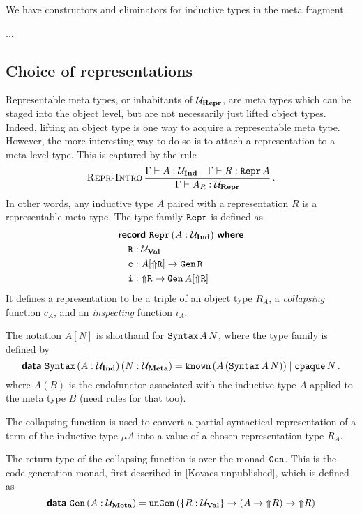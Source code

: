 We have constructors and eliminators for inductive types in the meta fragment.

...

\subsection{Choice of representations}

Representable meta types, or inhabitants of $\Ur$, are meta types which can be
staged into the object level, but are not necessarily just lifted object types.
Indeed, lifting an object type is one way to acquire a representable meta type.
However, the more interesting way to do so is to attach a representation to a
meta-level type. This is captured by the rule
\[
  \infrule[Repr-Intro]{\Gamma \vdash A : \Ui \quad \Gamma \vdash R : \defin{Repr}\,A}
  {\Gamma \vdash A_R : \Ur} \,.
\]
In other words, any inductive type $A$ paired with a representation $R$ is a
representable meta type. The type family $\Repr$ is defined as
\begin{align*}
   & \recordwhere[\,(A: \Ui)]{Repr}                                       \\
   & \quad \defin{R} : \Uv                                                \\
   & \quad    \defin{c} : A [\lift{\defin R}] \to \Gen \, \defin R \quad  \\
   & \quad    \defin{i} : \lift{\defin R} \to \Gen \, A [\lift{\defin R}]
\end{align*}
It defines a representation to be a triple of an object type $R_A$, a
\emph{collapsing} function $c_A$, and an \emph{inspecting} function $i_A$.

The notation $A[N]$ is shorthand for $\defin{Syntax}\,A\,N$, where the
 type family is defined by
\[
  \data{Syntax} \,(A : \Ui)\,(N : \Um) = \defin{known} \, (A\,(\defin{Syntax}\,A\,N)) \mid \defin{opaque} \, N \,.
\]
where $A(B)$ is the endofunctor associated with the inductive type $A$ applied
to the meta type $B$ (need rules for that too).

The collapsing function is used to convert a partial syntactical representation
of a term of the inductive type $\mu A$ into a value of a chosen representation
type $R_A$.

The return type of the collapsing function is over the monad $\Gen$. This is
the code generation monad, first described in [Kovacs unpublished], which is
defined as
\[
  \data{Gen} \, (A : \Um) = \defin{unGen} \, (\{ R : \Uv \} \to (A \to \lift R) \to \lift R)
\]

